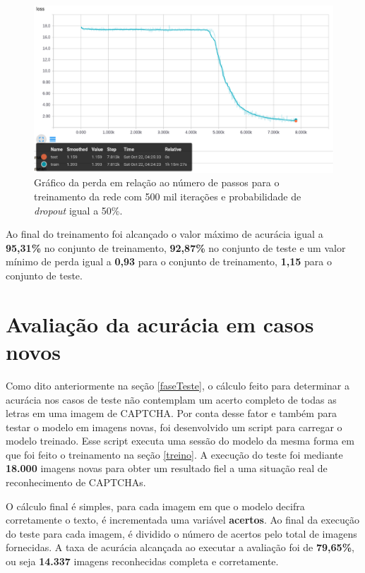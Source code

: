 \begin{figure}[H]
\centering
\includegraphics[scale=0.4]{imagens/loss_500k_dropout50}
\caption{Gráfico da perda em relação ao número de passos para o
  treinamento da rede com 500 mil iterações e probabilidade de
  \textit{dropout} igual a 50\%.}
\label{fig:loss_500k_dropout50}
\end{figure}

Ao final do treinamento foi alcançado o valor máximo de acurácia igual
a {\bf 95,31\%} no conjunto de treinamento, {\bf 92,87\%} no conjunto
de teste e um valor mínimo de perda igual a {\bf 0,93} para o conjunto
de treinamento, {\bf 1,15} para o conjunto de teste.

\section{Avaliação da acurácia em casos novos} \label{acuracia}

Como dito anteriormente na seção \ref{faseTeste}, o cálculo feito
para determinar a acurácia nos casos de teste não contemplam um acerto
completo de todas as letras em uma imagem de CAPTCHA. Por conta desse
fator e também para testar o modelo em imagens novas, foi desenvolvido
um script para carregar o modelo treinado. Esse script executa uma
sessão do modelo da mesma forma em que foi feito o treinamento na
seção \ref{treino}. A execução do teste foi mediante {\bf 18.000}
imagens novas para obter um resultado fiel a uma situação real de
reconhecimento de CAPTCHAs.

O cálculo final é simples, para cada imagem em que o modelo decifra
corretamente o texto, é incrementada uma variável {\bf acertos}. Ao
final da execução do teste para cada imagem, é dividido o número de
acertos pelo total de imagens fornecidas. A taxa de acurácia alcançada
ao executar a avaliação foi de {\bf 79,65\%}, ou seja {\bf 14.337}
imagens reconhecidas completa e corretamente.

